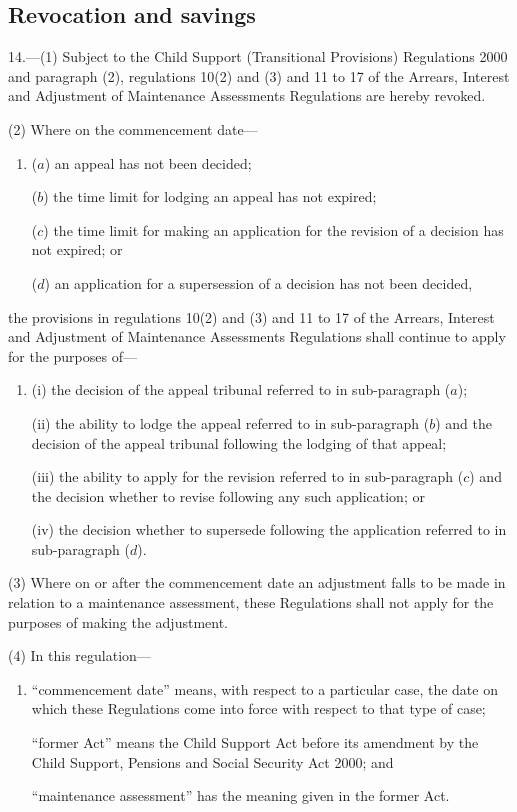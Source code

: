 \documentclass[12pt,a4paper]{article}
\begin{document}
\subsection[14, 15. Revocation and savings]{Revocation and savings}

14.---(1)  Subject to 
the Child Support (Transitional Provisions) Regulations 2000 and %
paragraph (2), regulations 10(2) and (3) and 11 to 17 of the Arrears, Interest and Adjustment of Maintenance Assessments Regulations are hereby revoked.

(2) Where on the commencement date—
\begin{enumerate}\item[]
($a$) an appeal has not been decided;

($b$) the time limit for lodging an appeal has not expired;

($c$) the time limit for making an application for the revision of a decision has not expired; or

($d$) an application for a supersession of a decision has not been decided,
\end{enumerate}
the provisions in regulations 10(2) and (3) and 11 to 17 of the Arrears, Interest and Adjustment of Maintenance Assessments Regulations shall continue to apply for the purposes of—
\begin{enumerate}\item[]
(i) the decision of the appeal tribunal referred to in sub-paragraph ($a$);

(ii) the ability to lodge the appeal referred to in sub-paragraph ($b$)  and the decision of the appeal tribunal following the lodging of that appeal;

(iii) the ability to apply for the revision referred to in sub-paragraph ($c$)  and the decision whether to revise following any such application; or

(iv) the decision whether to supersede following the application referred to in sub-paragraph ($d$).
\end{enumerate}

(3) Where on or after the commencement date an adjustment falls to be made in relation to a maintenance assessment, these Regulations shall not apply for the purposes of making the adjustment.

(4) In this regulation—
\begin{enumerate}\item[]
    “commencement date” means, with respect to a particular case, the date on which these Regulations come into force with respect to that type of case;

    “former Act” means the Child Support Act before its amendment by the Child Support, Pensions and Social Security Act 2000; and

    “maintenance assessment” has the meaning given in the former Act. 
\end{enumerate}
\end{document}
